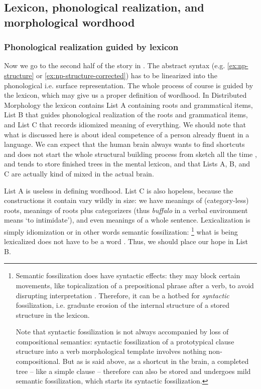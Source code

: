 \documentclass[a4paper, oneside, scheme=plain, 12pt]{article}
\newcommand{\form}[1]{\emph{#1}}
\newcommand{\translate}[1]{`#1'}
\begin{document}
\subsection{Lexicon, phonological realization, and morphological wordhood}\label{sec:vocabulary-inesrtion}

\subsubsection{Phonological realization guided by lexicon}\label{sec:realization}

Now we go to the second half of the story in .
The abstract syntax (e.g. \ref{ex:np-structure} or \ref{ex:np-structure-corrected})
has to be linearized into the phonological i.e. surface representation.
The whole process of course is guided by the lexicon,
which may give us a proper definition of wordhood.
In Distributed Morphology the lexicon contains List A containing roots and grammatical items,
List B that guides phonological realization of the roots and grammatical items,
and List C that records idiomized meaning of everything.
We should note that what is discussed here is about ideal competence of a person already fluent in a language.
We can expect that the human brain always wants to find shortcuts
and does not start the whole structural building process from sketch all the time \citep{matchin2020cortical},
and tends to store finished trees in the mental lexicon,
and that Lists A, B, and C are actually kind of mixed in the actual brain. 

List A is useless in defining wordhood.
List C is also hopeless, because the constructions it contain vary wildly in size:
we have meanings of (category-less) roots,
meanings of roots plus categorizers (thus \form{buffalo} in a verbal environment means \translate{to intimidate}),
and even meanings of a whole sentence.
Lexicalization is simply idiomization or in other words semantic fossilization:%
\footnote{
    Semantic fossilization does have syntactic effects:
    they may block certain movements, like topicalization of a prepositional phrase 
    after a verb, to avoid disrupting interpretation \citep{nediger2017unifying}.
    Therefore, it can be a hotbed for \emph{syntactic} fossilization,
    i.e. graduate erosion of the internal structure of a stored structure in the lexicon.

    Note that syntactic fossilization is not always accompanied by loss of compositional semantics:
    syntactic fossilization of a prototypical clause structure 
    into a verb morphological template involves nothing non-compositional.
    But as is said above, as a shortcut in the brain,
    a completed tree -- like a simple clause -- therefore can also be stored
    and undergoes mild semantic fossilization,
    which starts its syntactic fossilization.
}
what is being lexicalized does not have to be a word \citep{harley1999distributed}.
Thus, we should place our hope in List B. 
\end{document}
